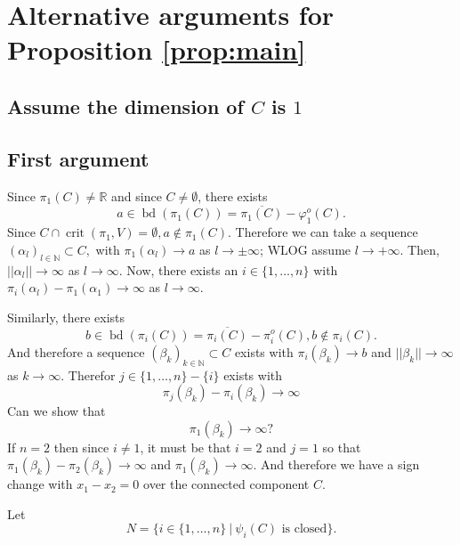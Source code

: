 \documentclass[11pt]{article}
\theoremstyle{definition}
\newcommand{\N}{\mathbb{N}}
\newcommand{\R}{\mathbb{R}}
\newcommand{\vp}{\varphi}
\DeclareMathOperator{\bd}{bd}
\DeclareMathOperator{\crit}{crit}
\begin{document}
\appendix

\section{Alternative arguments for Proposition \ref{prop:main}}


%
\subsection*{Assume the dimension of $C$ is $1$}



\subsection*{First argument}
Since $\pi_1(C) \not = \R$ and since $C \not = \emptyset$, there exists 
\[
a \in \bd(\pi_1(C)) = \overline{\pi_1(C)} - \vp_{1}^o(C).
\]
Since $C \cap \crit(\pi_1,V) = \emptyset, a \not \in \pi_1(C).$ Therefore we can take a sequence $(\alpha_l)_{l \in \N} \subset C,$ with $\pi_1(\alpha_l) \rightarrow a$ as $l \rightarrow \pm\infty$; WLOG assume $l \rightarrow +\infty.$ Then, $||\alpha_l|| \rightarrow \infty$ as $l \rightarrow \infty.$ Now, there exists an $i \in \{1,\hdots,n\}$ with $\pi_i(\alpha_l) - \pi_1(\alpha_1) \rightarrow \infty$ as $l \rightarrow \infty.$ 
\par 
Similarly, there exists 
\[
b \in \bd(\pi_i(C)) = \overline{\pi_i(C)} - \pi_i^o(C), b \not \in \pi_i(C).
\]
And therefore a sequence $(\beta_k)_{k \in \N} \subset C$ exists with $\pi_i(\beta_k) \rightarrow b$ and $|| \beta_k|| \rightarrow \infty$ as $k \rightarrow \infty.$ Therefor  $j \in \{1,\hdots,n\}-\{i\}$ exists with 
\[
\pi_j(\beta_k) - \pi_i(\beta_k) \rightarrow \infty
\]
\color{red}
Can we show that 
\[
\pi_1(\beta_k) \rightarrow \infty?
\]
\color{black}
If $n=2$ then since $i \not = 1$, it must be that $i=2$ and $j=1$ so that  $\pi_1(\beta_k) - \pi_2(\beta_k) \rightarrow \infty$ and $\pi_1(\beta_k) \rightarrow \infty.$ And therefore we have a sign change with $x_1-x_2=0$ over the connected component $C$. 
\par 
Let 
\[
N = \big\{i \in \{1,\hdots,n\} ~|~ \psi_i(C) \textrm{ is closed}\big\}. 
\]
\end{document}

